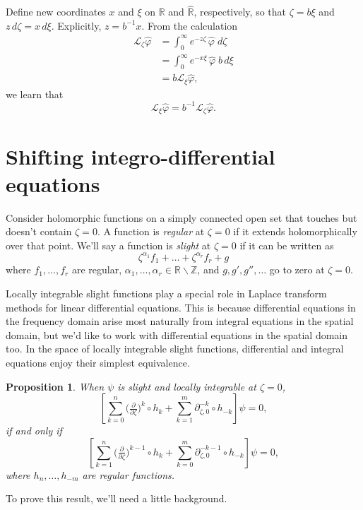 \documentclass{article}
\theoremstyle{plain}
\newtheorem{prop}{Proposition}
\newcommand{\Z}{\mathbb{Z}}
\newcommand{\R}{\mathbb{R}}
\newcommand{\laplace}{\mathcal{L}}
\newcommand{\fracderiv}[3]{\partial^{#1}_{#2, #3}}
\begin{document}
Define new coordinates $x$ and $\xi$ on $\R$ and $\hat{\R}$, respectively, so that $\zeta = b\xi$ and $z\,d\zeta = x\,d\xi$. Explicitly, $z = b^{-1}x$. From the calculation
\begin{align*}
\laplace_\zeta \hat{\varphi} & = \int_0^\infty e^{-z \zeta}\,\hat{\varphi}\;d\zeta \\
& = \int_0^\infty e^{-x\xi}\,\hat{\varphi}\;b\,d\xi \\
& = b \laplace_\xi \hat{\varphi},
\end{align*}
we learn that
\[ \laplace_\xi \hat{\varphi} = b^{-1} \laplace_\zeta \hat{\varphi}. \]
\section{Shifting integro-differential equations}\label{shifting}
Consider holomorphic functions on a simply connected open set that touches but doesn't contain $\zeta = 0$. A function is {\em regular} at $\zeta = 0$ if it extends holomorphically over that point. We'll say a function is {\em slight} at $\zeta = 0$ if it can be written as
\begin{equation}\label{eqn:slight-defn}
\zeta^{\alpha_1} f_1 + \ldots + \zeta^{\alpha_r} f_r + g
\end{equation}
where $f_1, \ldots, f_r$ are regular, $\alpha_1, \ldots, \alpha_r \in \R \smallsetminus \Z$, and $g, g', g'', \ldots$ go to zero at $\zeta = 0$.

Locally integrable slight functions play a special role in Laplace transform methods for linear differential equations. This is because differential equations in the frequency domain arise most naturally from integral equations in the spatial domain, but we'd like to work with differential equations in the spatial domain too. In the space of locally integrable slight functions, differential and integral equations enjoy their simplest equivalence.
\begin{prop}\label{prop:shifting}
When $\psi$ is slight and locally integrable at $\zeta = 0$,
\[ \left[ \sum_{k = 0}^n \big(\tfrac{\partial}{\partial \zeta}\big)^k \circ h_k + \sum_{k = 1}^m \fracderiv{-k}{\zeta}{0} \circ h_{-k} \right] \psi = 0, \]
if and only if
\[ \left[ \sum_{k = 1}^n \big(\tfrac{\partial}{\partial \zeta}\big)^{k-1} \circ h_k + \sum_{k = 0}^m \fracderiv{-k-1}{\zeta}{0} \circ h_{-k} \right] \psi = 0, \]
where $h_n, \ldots, h_{-m}$ are regular functions.
\end{prop}
To prove this result, we'll need a little background.
\end{document}
